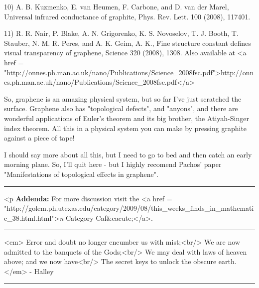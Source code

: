 10) A. B. Kuzmenko, E. van Heumen, F. Carbone, and D. van der Marel,
Universal infrared conductance of graphite, Phys. Rev. Lett. 100
(2008), 117401. 

11) R. R. Nair, P. Blake, A. N. Grigorenko, K. S. Novoselov, T.
J. Booth, T. Stauber, N. M. R. Peres, and A. K. Geim, A. K.,
Fine structure constant defines visual transparency of graphene,
Science 320 (2008), 1308.  Also available at
<a href = "http://onnes.ph.man.ac.uk/nano/Publications/Science_2008fsc.pdf">http://onnes.ph.man.ac.uk/nano/Publications/Science_2008fsc.pdf</a>

So, graphene is an amazing physical system, but so far I've just
scratched the surface.  Graphene also has "topological
defects", and "anyons", and there are wonderful
applications of Euler's theorem and its big brother, the Atiyah-Singer
index theorem.  All this in a physical system you can make by
pressing graphite against a piece of tape!

I should say more about all this, but I need to go to bed and then
catch an early morning plane.  So, I'll quit here - but I highly recomend
Pachos' paper "Manifestations of topological effects in graphene".

\par\noindent\rule{\textwidth}{0.4pt}
<p
\textbf{Addenda:} For more discussion visit the <a href =
"http://golem.ph.utexas.edu/category/2009/08/this_weeks_finds_in_mathematic_38.html.html">\emph{n}-Category
Caf&eacute;</a>.

\par\noindent\rule{\textwidth}{0.4pt}
<em>
Error and doubt no longer encumber us with mist;<br/>
We are now admitted to the banquets of the Gods;<br/>
We may deal with laws of heaven above; and we now have<br/>
The secret keys to unlock the obscure earth.</em> - Halley

\par\noindent\rule{\textwidth}{0.4pt}

